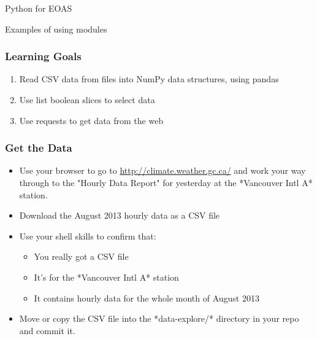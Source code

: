 \documentclass[xcolor=dvipsnames]{beamer}
\begin{document}
\begin{frame}
\begin{center}{\Huge Python for EOAS}
\end{center}
Examples of using modules
\end{frame}

\begin{frame}
\frametitle{Learning Goals}
\begin{enumerate}
\item  Read CSV data from files into NumPy data structures,
using pandas
\item Use list boolean slices to select data
\item Use requests to get data from the web
\end{enumerate}
\end{frame}

\begin{frame}
\frametitle{Get the Data}
\begin{itemize}
\item Use your browser to go to \url{http://climate.weather.gc.ca/} and work your way through to the "Hourly Data Report" for yesterday at the *Vancouver Intl A* station.
\item Download the August 2013 hourly data as a CSV file
\item Use your shell skills to confirm that:
\begin{itemize}
    \item You really got a CSV file
    \item It's for the *Vancouver Intl A* station
    \item It contains hourly data for the whole month of August 2013
\end{itemize}
\item Move or copy the CSV file into the *data-explore/* directory in your repo and commit it.
\end{itemize}
\end{frame}
\end{document}
